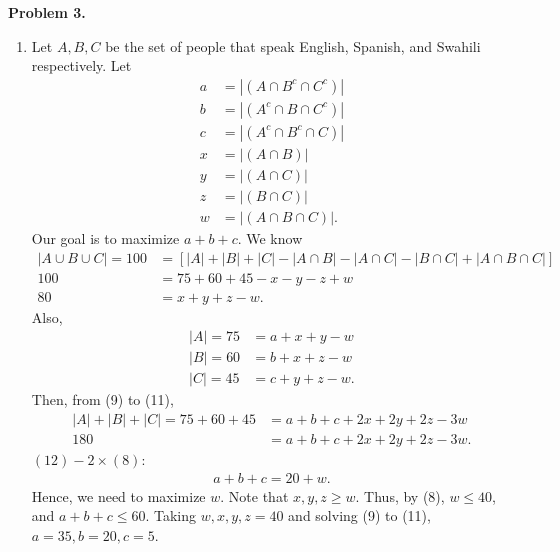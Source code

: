 \documentclass{article}
\begin{document}
\textbf{Problem 3.}
\begin{enumerate}[label={(\roman*)}]
    \item 
    Let $A,B,C$ be the set of people that speak English, Spanish, and Swahili respectively.
    Let 
    \begin{align}
        a&=|(A\cap B^c\cap C^c)|\nonumber\\
        b&=|(A^c\cap B\cap C^c)|\nonumber\\
        c&=|(A^c\cap B^c\cap C)|\nonumber\\
        x&=|(A\cap B)|\nonumber\\
        y&=|(A\cap C)|\nonumber\\
        z&=|(B \cap C)|\nonumber\\
        w&=|(A\cap B\cap C)|.\nonumber
    \end{align}
    Our goal is to maximize $a+b+c$.
    We know
    \begin{align}
        |A\cup B\cup C| = 100 &=\left[|A|+|B|+|C|-|A\cap B|-|A\cap C|-|B\cap C|+|A\cap B\cap C|\right] \nonumber\\
        100 &=75+60+45-x-y-z+w \nonumber\\
    80 &=x+y+z-w.
\end{align}
Also, 
\begin{align}
    |A| = 75& =a+x+y-w \\
    |B| = 60& =b+x+z-w \\
    |C| = 45& =c+y+z-w. 
\end{align}
Then, from (9) to (11),
\begin{align}
    |A|+|B|+|C|=75+60+45&=a+b+c+2x+2y+2z-3w \nonumber \\
    180& = a+b+c+2x+2y+2z-3w.
\end{align}
$(12)-2\times(8)$:
\begin{align}
    a+b+c=20+w.
\end{align}
Hence, we need to maximize $w$. Note that $x,y,z\ge w$. Thus, by (8), $w\le 40$, and $a+b+c\le 60$.
Taking $w,x,y,z=40$ and solving (9) to (11), $a=35,b=20,c=5$.
    

\end{enumerate}
\end{document}

